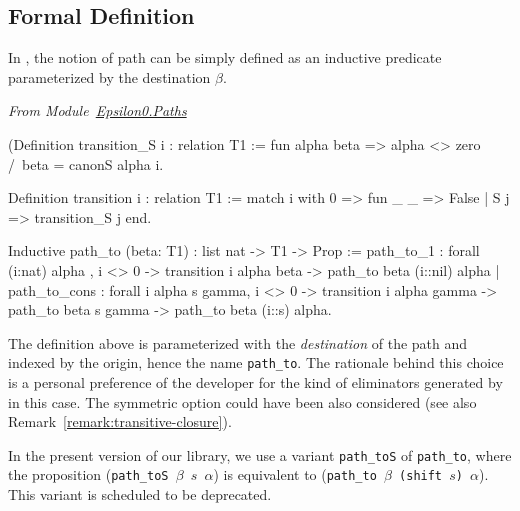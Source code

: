 \subsection{Formal Definition}

\label{path-to-definition}

In \coq{}, the notion of path can be simply defined as an inductive predicate 
parameterized by the destination $\beta$.

\vspace{4pt}
\emph{From Module~\href{../theories/html/hydras.Epsilon0.Paths.html}{Epsilon0.Paths}}

\label{sect:path-to-def}

\begin{Coqsrc}
(Definition transition_S i : relation T1 :=
  fun alpha beta =>  alpha <> zero /\ beta = canonS alpha i.

Definition transition i : relation T1 :=
  match i with 0 => fun _ _ => False | S j => transition_S j end.

Inductive path_to (beta: T1) : list nat -> T1 -> Prop :=
  path_to_1 : forall (i:nat) alpha , 
    i <> 0 ->
    transition i alpha beta ->
    path_to beta (i::nil) alpha
| path_to_cons : forall i alpha s gamma,
    i <> 0 ->
    transition i alpha gamma ->
    path_to beta  s gamma ->
    path_to beta  (i::s) alpha.
\end{Coqsrc}

\begin{remark}
The definition above is parameterized with the \emph{destination} of the path and indexed by the origin, hence the name \texttt{path\_to}. The rationale behind this choice is a personal preference of the developer  for the kind of eliminators generated by \coq{} in this case. The symmetric option could have been also considered (see also Remark~\vref{remark:transitive-closure}).
\end{remark}



\begin{remark}
In the present version of our library, we use a variant \texttt{path\_toS} of
\texttt{path\_to}, where the proposition
(\texttt{path\_toS $\beta$ $s$ $\alpha$}) is equivalent to
(\texttt{path\_to $\beta$ (shift $s$) $\alpha$}). This variant is scheduled to be deprecated.
\end{remark}


